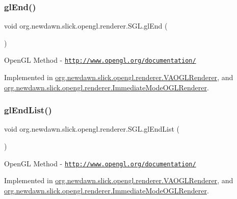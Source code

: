 \subsubsection{\texorpdfstring{gl\+End()}{glEnd()}}
{\footnotesize\ttfamily void org.\+newdawn.\+slick.\+opengl.\+renderer.\+S\+G\+L.\+gl\+End (\begin{DoxyParamCaption}{ }\end{DoxyParamCaption})}

Open\+GL Method -\/  \href{http://www.opengl.org/documentation/}{\tt http\+://www.\+opengl.\+org/documentation/} 

Implemented in \mbox{\hyperlink{classorg_1_1newdawn_1_1slick_1_1opengl_1_1renderer_1_1_v_a_o_g_l_renderer_aa652d16e703985c4415f750d7e4483d5}{org.\+newdawn.\+slick.\+opengl.\+renderer.\+V\+A\+O\+G\+L\+Renderer}}, and \mbox{\hyperlink{classorg_1_1newdawn_1_1slick_1_1opengl_1_1renderer_1_1_immediate_mode_o_g_l_renderer_aed3061aaf4d048fe00f25d191974b0f3}{org.\+newdawn.\+slick.\+opengl.\+renderer.\+Immediate\+Mode\+O\+G\+L\+Renderer}}.

\mbox{\label{interfaceorg_1_1newdawn_1_1slick_1_1opengl_1_1renderer_1_1_s_g_l_a300a1d9b3c984ccc0a59eb951821bf37}} 
\subsubsection{\texorpdfstring{gl\+End\+List()}{glEndList()}}
{\footnotesize\ttfamily void org.\+newdawn.\+slick.\+opengl.\+renderer.\+S\+G\+L.\+gl\+End\+List (\begin{DoxyParamCaption}{ }\end{DoxyParamCaption})}

Open\+GL Method -\/  \href{http://www.opengl.org/documentation/}{\tt http\+://www.\+opengl.\+org/documentation/} 

Implemented in \mbox{\hyperlink{classorg_1_1newdawn_1_1slick_1_1opengl_1_1renderer_1_1_v_a_o_g_l_renderer_abc1608fbc94c9ad4101ed15cea4e66ef}{org.\+newdawn.\+slick.\+opengl.\+renderer.\+V\+A\+O\+G\+L\+Renderer}}, and \mbox{\hyperlink{classorg_1_1newdawn_1_1slick_1_1opengl_1_1renderer_1_1_immediate_mode_o_g_l_renderer_a2896ef315ccd6ee04732a3f8c717ffc1}{org.\+newdawn.\+slick.\+opengl.\+renderer.\+Immediate\+Mode\+O\+G\+L\+Renderer}}.

